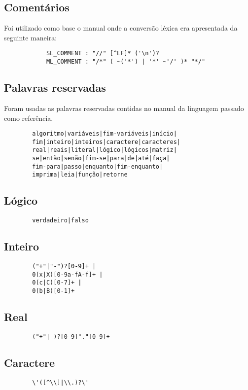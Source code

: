 \documentclass[a4paper,10pt]{article}
\begin{document}
	\subsection{Coment\'arios}
		Foi utilizado como base o manual onde a conversão léxica era apresentada da seguinte maneira:
		\begin{verbatim}
			SL_COMMENT : "//" [^LF]* ('\n')?
			ML_COMMENT : "/*" ( ~('*') | '*' ~'/' )* "*/"
		\end{verbatim}

	\subsection{Palavras reservadas}
		Foram usadas as palavras reservadas contidas no manual da linguagem
		passado como referência.
		\begin{verbatim}
		algoritmo|variáveis|fim-variáveis|início|
		fim|inteiro|inteiros|caractere|caracteres|
		real|reais|literal|lógico|lógicos|matriz|
		se|então|senão|fim-se|para|de|até|faça|
		fim-para|passo|enquanto|fim-enquanto|
		imprima|leia|função|retorne
		\end{verbatim}

	\subsection{Lógico}
		\begin{verbatim}
		verdadeiro|falso
		\end{verbatim}

	\subsection{Inteiro}
		\begin{verbatim}
		("+"|"-")?[0-9]+ |
		0(x|X)[0-9a-fA-f]+ |
		0(c|C)[0-7]+ |
		0(b|B)[0-1]+
		\end{verbatim}

	\subsection{Real}
		\begin{verbatim}
		("+"|-)?[0-9]"."[0-9]+
		\end{verbatim}

	\subsection{Caractere}
		\begin{verbatim}
		\'([^\\]|\\.)?\'
		\end{verbatim}
\end{document}
